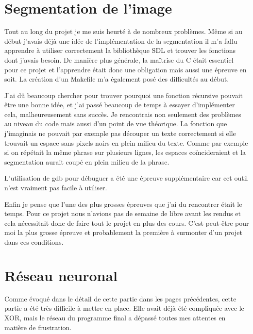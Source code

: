 \documentclass[12pt]{report}
\begin{document}
\section*{Segmentation de l'image}

Tout au long du projet je me suis heurté à de nombreux problèmes. Même si au début j'avais déjà une idée de l'implémentation de la segmentation il m'a fallu apprendre à utiliser correctement la bibliothèque SDL et trouver les fonctions dont j'avais besoin. De manière plus générale, la maîtrise du C était essentiel pour ce projet et l'apprendre était donc une obligation mais aussi une épreuve en soit. La création d'un Makefile m'a également posé des difficultés au début. 

J'ai dû beaucoup chercher pour trouver pourquoi une fonction récursive pouvait être une bonne idée, et j'ai passé beaucoup de temps à essayer d'implémenter cela, malheureusement sans succès. Je rencontrais non seulement des problèmes au niveau du code mais aussi d'un point de vue théorique. La fonction que j'imaginais ne pouvait par exemple pas découper un texte correctement si elle trouvait un espace sans pixels noirs en plein milieu du texte. Comme par exemple si on répétait la même phrase sur plusieurs lignes, les espaces coïncideraient et la segmentation aurait coupé en plein milieu de la phrase. 

L'utilisation de gdb pour débuguer a été une épreuve supplémentaire car cet outil n'est vraiment pas facile à utiliser. 

Enfin je pense que l'une des plus grosses épreuves que j'ai du rencontrer était le temps. Pour ce projet nous n'avions pas de semaine de libre avant les rendus et cela nécessitait donc de faire tout le projet en plus des cours. C'est peut-être pour moi la plus grosse épreuve et probablement la première à surmonter d'un projet dans ces conditions.

\section*{Réseau neuronal}

Comme évoqué dans le détail de cette partie dans les pages précédentes, cette partie a été très difficile à mettre en place. Elle avait déjà été compliquée avec le XOR, mais le réseau du programme final a dépassé toutes mes attentes en matière de frustration.
\end{document}
